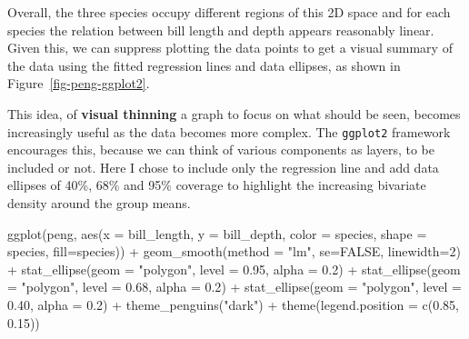 \documentclass[
  letterpaper,
  10pt,
  krantz2]{krantz}
\makeatletter
\newenvironment{Shaded}{\begin{snugshade}}{\end{snugshade}}
\newcommand{\AttributeTok}[1]{\textcolor[rgb]{0.40,0.45,0.13}{#1}}
\newcommand{\ConstantTok}[1]{\textcolor[rgb]{0.56,0.35,0.01}{#1}}
\newcommand{\DecValTok}[1]{\textcolor[rgb]{0.68,0.00,0.00}{#1}}
\newcommand{\FloatTok}[1]{\textcolor[rgb]{0.68,0.00,0.00}{#1}}
\newcommand{\FunctionTok}[1]{\textcolor[rgb]{0.28,0.35,0.67}{#1}}
\newcommand{\NormalTok}[1]{\textcolor[rgb]{0.00,0.23,0.31}{#1}}
\newcommand{\SpecialCharTok}[1]{\textcolor[rgb]{0.37,0.37,0.37}{#1}}
\newcommand{\StringTok}[1]{\textcolor[rgb]{0.13,0.47,0.30}{#1}}
\newenvironment{kframe}{%
  \medskip{}
  \setlength{\fboxsep}{.8em}
  \def\at@end@of@kframe{}%
  \ifinner\ifhmode%
  \def\at@end@of@kframe{\end{minipage}}%
  \begin{minipage}{\columnwidth}%
  \fi\fi%
  \def\FrameCommand##1{\hskip\@totalleftmargin \hskip-\fboxsep
  \colorbox{shadecolor}{##1}\hskip-\fboxsep
      \hskip-\linewidth \hskip-\@totalleftmargin \hskip\columnwidth}%
  \MakeFramed {\advance\hsize-\width
    \@totalleftmargin\z@ \linewidth\hsize
    \@setminipage}}%
{\par\unskip\endMakeFramed%
  \at@end@of@kframe}
\renewenvironment{Shaded}{\begin{kframe}}{\end{kframe}}
\makeatother
\begin{document}
Overall, the three species occupy different regions of this 2D space and
for each species the relation between bill length and depth appears
reasonably linear. Given this, we can suppress plotting the data points
to get a visual summary of the data using the fitted regression lines
and data ellipses, as shown in Figure~\ref{fig-peng-ggplot2}.

This idea, of \textbf{visual thinning} a graph to focus on what should
be seen, becomes increasingly useful as the data becomes more complex.
The \texttt{ggplot2} framework encourages this, because we can think of
various components as layers, to be included or not. Here I chose to
include only the regression line and add data ellipses of 40\%, 68\% and
95\% coverage to highlight the increasing bivariate density around the
group means.

\begin{Shaded}
\begin{Highlighting}[]
\FunctionTok{ggplot}\NormalTok{(peng, }
       \FunctionTok{aes}\NormalTok{(}\AttributeTok{x =}\NormalTok{ bill\_length, }\AttributeTok{y =}\NormalTok{ bill\_depth,}
           \AttributeTok{color =}\NormalTok{ species, }\AttributeTok{shape =}\NormalTok{ species, }\AttributeTok{fill=}\NormalTok{species)) }\SpecialCharTok{+}
  \FunctionTok{geom\_smooth}\NormalTok{(}\AttributeTok{method =} \StringTok{"lm"}\NormalTok{,  }\AttributeTok{se=}\ConstantTok{FALSE}\NormalTok{, }\AttributeTok{linewidth=}\DecValTok{2}\NormalTok{) }\SpecialCharTok{+}
  \FunctionTok{stat\_ellipse}\NormalTok{(}\AttributeTok{geom =} \StringTok{"polygon"}\NormalTok{, }\AttributeTok{level =} \FloatTok{0.95}\NormalTok{, }\AttributeTok{alpha =} \FloatTok{0.2}\NormalTok{) }\SpecialCharTok{+}
  \FunctionTok{stat\_ellipse}\NormalTok{(}\AttributeTok{geom =} \StringTok{"polygon"}\NormalTok{, }\AttributeTok{level =} \FloatTok{0.68}\NormalTok{, }\AttributeTok{alpha =} \FloatTok{0.2}\NormalTok{) }\SpecialCharTok{+}
  \FunctionTok{stat\_ellipse}\NormalTok{(}\AttributeTok{geom =} \StringTok{"polygon"}\NormalTok{, }\AttributeTok{level =} \FloatTok{0.40}\NormalTok{, }\AttributeTok{alpha =} \FloatTok{0.2}\NormalTok{) }\SpecialCharTok{+}
  \FunctionTok{theme\_penguins}\NormalTok{(}\StringTok{"dark"}\NormalTok{) }\SpecialCharTok{+}
  \FunctionTok{theme}\NormalTok{(}\AttributeTok{legend.position =} \FunctionTok{c}\NormalTok{(}\FloatTok{0.85}\NormalTok{, }\FloatTok{0.15}\NormalTok{))}
\end{Highlighting}
\end{Shaded}
\end{document}
